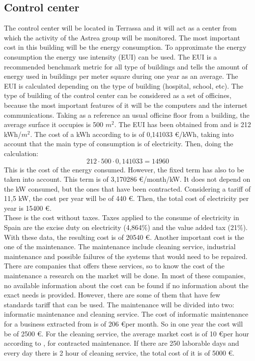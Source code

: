 \documentclass[12pt,a4paper]{report}
\begin{document}
\subsection{Control center}
The control center will be located in Terrassa and it will act as a center from which the activity of the Astrea group will be monitored. The most important cost in this building will be the energy consumption. To approximate the energy consumption the energy use intensity (EUI) can be used. The EUI is a recommended benchmark metric for all type of buildings and tells the amount of energy used in buildings per meter square during one year as an average. The EUI is calculated depending on the type of building (hospital, school, etc). The type of building of the control center can be considered as a set of officines, because the most important features of it will be the computers and the internet communications. Taking as a reference an usual officine floor from a building, the average surface it occupies is 500 $m^2$. The EUI has been obtained from \cite{EUI} and is 212 kWh/$m^2$. The cost of a kWh according to \cite{endesa} is of 0,141033 \euro /kWh, taking into account that the main type of consumption is of electricity. Then, doing the calculation: 
\begin{equation}
212 \cdot 500 \cdot 0,141033 = 14960
\end{equation} 
This is the cost of the energy consumed. However, the fixed term has also to be taken into account. This term is of 3,170286 \euro /month/kW. It does not depend on the kW consumed, but the ones that have been contracted. Considering a tariff of 11,5 kW, the cost per year will be of 440 \euro. Then, the total cost of electricity per year is 15400 \euro.\\ These is the cost without taxes. Taxes applied to the consume of electricity in Spain are the excise duty on electricity (4,864\%) and the value added tax (21\%). With these data, the resulting cost is of 20540 \euro. 
Another important cost is the one of the maintenance. The maintenance include cleaning service, industrial maintenance and possible failures of the systems that would need to be repaired. There are companies that offers these services, so to know the cost of the maintenance a research on the market will be done. In most of these companies, no available information about the cost can be found if no information about the exact needs is provided. However, there are some of them that have few standards tariff that can be used. The maintenance will be divided into two: informatic maintenance and cleaning service. The cost of informatic maintenance for a business extracted from \cite{inf} is of 206 \euro per month. So in one year the cost will be of 2500 \euro. For the cleaning service, the average market cost is of 10 \euro per hour according to \cite{clean}, for contracted maintenance. If there are 250 laborable days and every day there is 2 hour of cleaning service, the total cost of it is of 5000 \euro. \\
\end{document}
